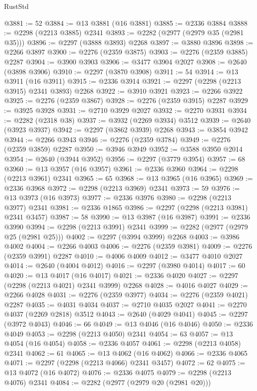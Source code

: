 \begin{lexlean}{RustStd}
\begin{coremodule}
{\begin{coremodule}
{{{{{{{{{{{{{{{{{{{{{{{{{{{{{{{{{{{{{{{{{{{{{{{{{{{{{{@3881 := 52
@3884 := @13 @3881 (@16 @3881)
@3885 := @2336 @3884
@3888 := @2298 (@2213 @3885) @2341
@3893 := @2282 (@2977 (@2979 @35 (@2981 @35)))
@3896 := @2297 (@3888 @3893) @2268
@3897 := @3880 @3896
@3898 := @2266 @3897
@3900 := @2276 (@2359 @3875)
@3903 := @2276 (@2359 @3885) @2287
@3904 := @3900 @3903
@3906 := @3477 @3904 @2027
@3908 := @2640 (@3898 @3906)
@3910 := @2297 (@3870 @3908)
@3911 := 54
@3914 := @13 @3911 (@16 @3911)
@3915 := @2336 @3914
@3921 := @2297 (@2298 (@2213 @3915) @2341 @3893) @2268
@3922 := @3910 @3921
@3923 := @2266 @3922
@3925 := @2276 (@2359 @3867)
@3928 := @2276 (@2359 @3915) @2287
@3929 := @3925 @3928
@3931 := @2710 @3929 @2027
@3932 := @2270 @3931
@3934 := @2282 (@2318 @38)
@3937 := @3932 (@2269 @3934) @3512
@3939 := @2640 (@3923 @3937)
@3942 := @2297 (@3862 @3939) @2268
@3943 := @3854 @3942
@3944 := @2266 @3943
@3946 := @2276 (@2359 @3784)
@3949 := @2276 (@2359 @3859) @2287
@3950 := @3946 @3949
@3952 := @3588 @3950 @2014
@3954 := @2640 (@3944 @3952)
@3956 := @2297 (@3779 @3954)
@3957 := 68
@3960 := @13 @3957 (@16 @3957)
@3961 := @2336 @3960
@3964 := @2298 (@2213 @3961) @2341
@3965 := 65
@3968 := @13 @3965 (@16 @3965)
@3969 := @2336 @3968
@3972 := @2298 (@2213 @3969) @2341
@3973 := 59
@3976 := @13 @3973 (@16 @3973)
@3977 := @2336 @3976
@3980 := @2298 (@2213 @3977) @2341
@3981 := @2336 @1865
@3986 := @2297 (@2298 (@2213 @3981) @2341 @3457)
@3987 := 58
@3990 := @13 @3987 (@16 @3987)
@3991 := @2336 @3990
@3994 := @2298 (@2213 @3991) @2341
@3999 := @2282 (@2977 (@2979 @25 (@2981 @25)))
@4002 := @2297 (@3994 @3999) @2268
@4003 := @3986 @4002
@4004 := @2266 @4003
@4006 := @2276 (@2359 @3981)
@4009 := @2276 (@2359 @3991) @2287
@4010 := @4006 @4009
@4012 := @3477 @4010 @2027
@4014 := @2640 (@4004 @4012)
@4016 := @2297 (@3980 @4014)
@4017 := 60
@4020 := @13 @4017 (@16 @4017)
@4021 := @2336 @4020
@4027 := @2297 (@2298 (@2213 @4021) @2341 @3999) @2268
@4028 := @4016 @4027
@4029 := @2266 @4028
@4031 := @2276 (@2359 @3977)
@4034 := @2276 (@2359 @4021) @2287
@4035 := @4031 @4034
@4037 := @2710 @4035 @2027
@4041 := @2270 @4037 (@2269 @2818) @3512
@4043 := @2640 (@4029 @4041)
@4045 := @2297 (@3972 @4043)
@4046 := 66
@4049 := @13 @4046 (@16 @4046)
@4050 := @2336 @4049
@4053 := @2298 (@2213 @4050) @2341
@4054 := 63
@4057 := @13 @4054 (@16 @4054)
@4058 := @2336 @4057
@4061 := @2298 (@2213 @4058) @2341
@4062 := 61
@4065 := @13 @4062 (@16 @4062)
@4066 := @2336 @4065
@4071 := @2297 (@2298 (@2213 @4066) @2341 @3457)
@4072 := 62
@4075 := @13 @4072 (@16 @4072)
@4076 := @2336 @4075
@4079 := @2298 (@2213 @4076) @2341
@4084 := @2282 (@2977 (@2979 @20 (@2981 @20)))
}}}}}}}}}}}}}}}}}}}}}}}}}}}}}}}}}}}}}}}}}}}}}}}}}}}}}}
\end{coremodule}}
\end{coremodule}
\end{lexlean}
